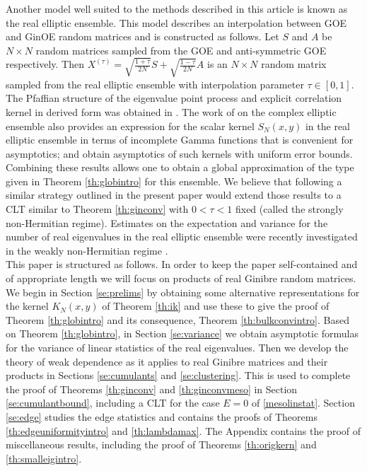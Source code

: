 \documentclass[11pt,reqno]{amsproc}
\numberwithin{equation}{section}
\numberwithin{theorem}{section}
\begin{document}
Another model well suited to the methods described in this article is known as the real elliptic ensemble. This model describes an interpolation between GOE and GinOE random matrices and is constructed as follows. Let $S$ and $A$ be $N \times N$ random matrices sampled from the GOE and anti-symmetric GOE respectively.
Then $X^{(\tau)} = \sqrt{\frac{1+\tau}{2N}} S + \sqrt{\frac{1-\tau}{2N}} A$ is an $N \times N$ random matrix sampled from the real elliptic ensemble with interpolation parameter 
$\tau \in [0, 1]$. The Pfaffian structure of the eigenvalue point process and explicit correlation kernel in derived form was obtained in \cite{FN08}. The work of \cite{FSK98} on the complex elliptic ensemble also provides an
expression for the scalar kernel $S_{N}(x,y)$ in the real elliptic ensemble in terms of incomplete Gamma functions that is convenient for asymptotics; and \cite{AKV16} obtain asymptotics of such kernels with uniform error bounds. Combining these results allows one to obtain a global approximation of the type given in Theorem \ref{th:globintro} for this ensemble. We believe that following a similar strategy outlined in the present paper would extend those results to a CLT similar to Theorem \ref{th:ginconv} with $0 < \tau < 1$ fixed (called the strongly non-Hermitian regime). Estimates on the expectation and variance for the number of real eigenvalues in the real elliptic ensemble were recently investigated in the weakly non-Hermitian regime \cite{BKLL21}.\\

This paper is structured as follows. In order to keep the paper self-contained and of appropriate length we will focus on products of real Ginibre random matrices. We begin in Section \ref{se:prelims} by obtaining some alternative representations for the kernel $K_{N}(x,y)$ of Theorem \ref{th:ik} and use these to give the proof of Theorem \ref{th:globintro} and its consequence, Theorem \ref{th:bulkconvintro}. Based on Theorem \ref{th:globintro}, in Section \ref{se:variance} we obtain asymptotic formulas for the variance of linear statistics of the real eigenvalues. Then we develop the theory of weak dependence as it applies to real Ginibre matrices and their products in Sections \ref{se:cumulants} and \ref{se:clustering}. This is used to complete the proof of Theorems \ref{th:ginconv} and \ref{th:ginconvmeso} in Section \ref{se:cumulantbound}, including a CLT for the case $E=0$ of \eqref{mesolinstat}. Section \ref{se:edge} studies the edge statistics and contains the proofs of Theorems \ref{th:edgeuniformityintro} and \ref{th:lambdamax}. The Appendix contains the proof of miscellaneous results, including the proof of Theorems \ref{th:origkern} and \ref{th:smalleigintro}.
\end{document}
